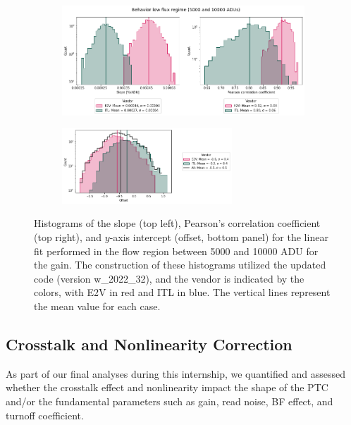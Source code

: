 \begin{figure}[!htb]
     \centering
     \begin{subfigure}[b]{\textwidth}
         \centering
         \includegraphics[width=\textwidth]{Figures/Histogram_slope_corr_new.png}
     \end{subfigure}
     \vspace{3mm}
     \begin{subfigure}[b]{\textwidth}
         \centering
         \includegraphics[width=0.7\textwidth]{Figures/Histogram_offset_new.png}
     \end{subfigure}
        \caption{Histograms of the slope (top left), Pearson's correlation coefficient (top right), and $y$-axis intercept (offset, bottom panel) for the linear fit performed in the flow region between 5000 and 10000 ADU for the gain. The construction of these histograms utilized the updated code (version w\_2022\_32), and the vendor is indicated by the colors, with E2V in red and ITL in blue. The vertical lines represent the mean value for each case.}
        \label{fig:histogram_linearfit}
\end{figure}


\subsection{Crosstalk and Nonlinearity Correction} \label{subsec:crosstalk_and_linearity}

As part of our final analyses during this internship, we quantified and assessed whether the crosstalk effect and nonlinearity impact the shape of the PTC and/or the fundamental parameters such as gain, read noise, BF effect, and turnoff coefficient.

